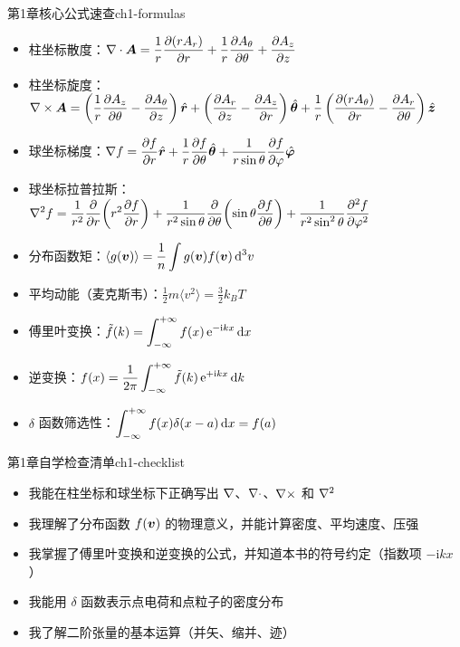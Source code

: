 \begin{formulabox}{第1章核心公式速查}{ch1-formulas}
\begin{itemize}[leftmargin=*,itemsep=0pt]
\item 柱坐标散度：$\displaystyle\nabla\cdot\bm{A} = \frac{1}{r}\frac{\partial(rA_r)}{\partial r} + \frac{1}{r}\frac{\partial A_\theta}{\partial\theta} + \frac{\partial A_z}{\partial z}$
\item 柱坐标旋度：$\displaystyle\nabla\times\bm{A} = \left(\frac{1}{r}\frac{\partial A_z}{\partial\theta} - \frac{\partial A_\theta}{\partial z}\right)\hat{\bm{r}} + \left(\frac{\partial A_r}{\partial z} - \frac{\partial A_z}{\partial r}\right)\hat{\bm{\theta}} + \frac{1}{r}\left(\frac{\partial(rA_\theta)}{\partial r} - \frac{\partial A_r}{\partial\theta}\right)\hat{\bm{z}}$
\item 球坐标梯度：$\displaystyle\nabla f = \frac{\partial f}{\partial r}\hat{\bm{r}} + \frac{1}{r}\frac{\partial f}{\partial\theta}\hat{\bm{\theta}} + \frac{1}{r\sin\theta}\frac{\partial f}{\partial\varphi}\hat{\bm{\varphi}}$
\item 球坐标拉普拉斯：$\displaystyle\nabla^2 f = \frac{1}{r^2}\frac{\partial}{\partial r}\!\left(r^2\frac{\partial f}{\partial r}\right) + \frac{1}{r^2\sin\theta}\frac{\partial}{\partial\theta}\!\left(\sin\theta\frac{\partial f}{\partial\theta}\right) + \frac{1}{r^2\sin^2\theta}\frac{\partial^2 f}{\partial\varphi^2}$
\item 分布函数矩：$\displaystyle\langle g(\bm{v})\rangle = \frac{1}{n}\int g(\bm{v})f(\bm{v})\,\mathrm{d}^3v$
\item 平均动能（麦克斯韦）：$\displaystyle\frac{1}{2}m\langle v^2\rangle = \frac{3}{2}k_{\!B}T$
\item 傅里叶变换：$\displaystyle\tilde{f}(k) = \int_{-\infty}^{+\infty} f(x)\,\mathrm{e}^{-\mathrm{i} kx}\,\mathrm{d} x$
\item 逆变换：$\displaystyle f(x) = \frac{1}{2\pi}\int_{-\infty}^{+\infty} \tilde{f}(k)\,\mathrm{e}^{+\mathrm{i} kx}\,\mathrm{d} k$
\item $\delta$ 函数筛选性：$\displaystyle\int_{-\infty}^{+\infty} f(x)\delta(x-a)\,\mathrm{d} x = f(a)$
\end{itemize}
\end{formulabox}

\begin{checklistbox}{第1章自学检查清单}{ch1-checklist}
\begin{itemize}[leftmargin=*,label=$\square$]
\item 我能在柱坐标和球坐标下正确写出 $\nabla$、$\nabla\cdot$、$\nabla\times$ 和 $\nabla^2$
\item 我理解了分布函数 $f(\bm{v})$ 的物理意义，并能计算密度、平均速度、压强
\item 我掌握了傅里叶变换和逆变换的公式，并知道本书的符号约定（指数项 $-\mathrm{i}kx$）
\item 我能用 $\delta$ 函数表示点电荷和点粒子的密度分布
\item 我了解二阶张量的基本运算（并矢、缩并、迹）
\end{itemize}
\end{checklistbox}

\endinput
